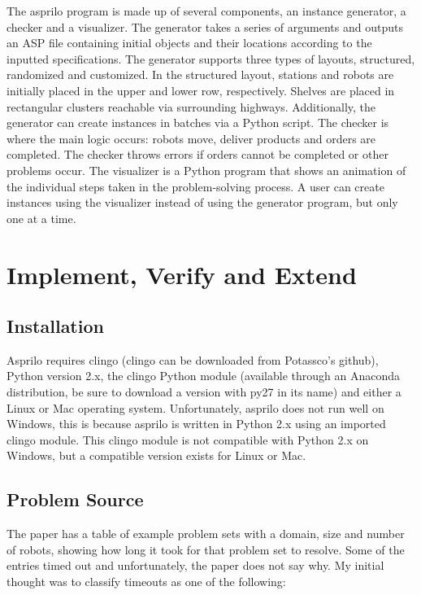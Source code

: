 \documentclass[12pt]{article}
\begin{document}
The asprilo program is made up of several components, an instance generator, a checker and a visualizer. The generator takes a series of arguments and outputs an ASP file containing initial objects and their locations according to the inputted specifications. The generator supports three types of layouts, structured, randomized and customized. In the structured layout, stations and robots are initially placed in the upper and lower row, respectively. Shelves are placed in rectangular clusters reachable via surrounding highways. Additionally, the generator can create instances in batches via a Python script. The checker is where the main logic occurs: robots move, deliver products and orders are completed. The checker throws errors if orders cannot be completed or other problems occur. The visualizer is a Python program that shows an animation of the individual steps taken in the problem-solving process. A user can create instances using the visualizer instead of using the generator program, but only one at a time.

\section*{Implement, Verify and Extend}

\subsection*{Installation}

Asprilo requires clingo (clingo can be downloaded from Potassco’s github), Python version 2.x, the clingo Python module (available through an Anaconda distribution, be sure to download a version with py27 in its name) and either a Linux or Mac operating system. Unfortunately, asprilo does not run well on Windows, this is because asprilo is written in Python 2.x using an imported clingo module. This clingo module is not compatible with Python 2.x on Windows, but a compatible version exists for Linux or Mac.

\subsection*{Problem Source}

The paper has a table of example problem sets with a domain, size and number of robots, showing how long it took for that problem set to resolve. Some of the entries timed out and unfortunately, the paper does not say why. My initial thought was to classify timeouts as one of the following:
\end{document}

